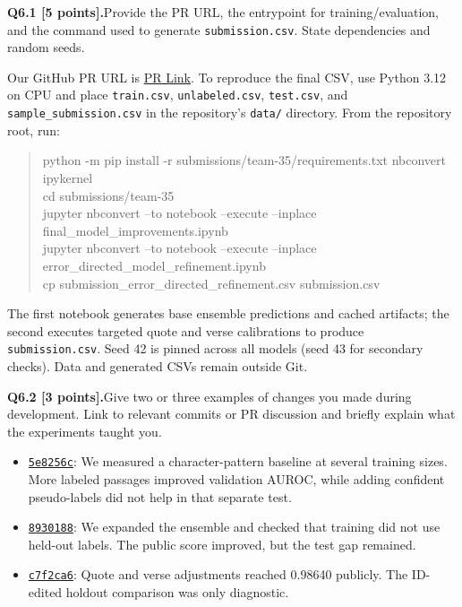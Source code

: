 \documentclass[11pt,letterpaper]{article}
\newcommand{\question}[2]{\needspace{4\baselineskip}\par\addvspace{0.45em}\noindent\textbf{#1}\quad #2\par\nobreak\vspace{0.1em}}
\begin{document}
\question{Q6.1 [5 points].}{Provide the PR URL, the entrypoint for training/evaluation, and the command used to generate \texttt{submission.csv}. State dependencies and random seeds.}
Our GitHub PR URL is \href{https://github.com/sekhari/human-or-ai-submissions/pull/6}{PR Link}. To reproduce the final CSV, use Python 3.12 on CPU and place \texttt{train.csv}, \texttt{unlabeled.csv}, \texttt{test.csv}, and \texttt{sample\_submission.csv} in the repository's \texttt{data/} directory. From the repository root, run:
\begin{quote}\vspace{-0.5em}\footnotesize\ttfamily
python -m pip install -r submissions/team-35/requirements.txt nbconvert ipykernel\\
cd submissions/team-35\\
jupyter nbconvert --to notebook --execute --inplace final\_model\_improvements.ipynb\\
jupyter nbconvert --to notebook --execute --inplace error\_directed\_model\_refinement.ipynb\\
cp submission\_error\_directed\_refinement.csv submission.csv
\vspace{-0.5em}\end{quote}
The first notebook generates base ensemble predictions and cached artifacts; the second executes targeted quote and verse calibrations to produce \texttt{submission.csv}. Seed 42 is pinned across all models (seed 43 for secondary checks). Data and generated CSVs remain outside Git.

\question{Q6.2 [3 points].}{Give two or three examples of changes you made during development. Link to relevant commits or PR discussion and briefly explain what the experiments taught you.}
\begin{itemize}[topsep=0pt,itemsep=0pt,parsep=0pt]
\item \href{https://github.com/jaminatore/human-or-ai-submissions/commit/5e8256c}{\texttt{5e8256c}}: We measured a character-pattern baseline at several training sizes. More labeled passages improved validation AUROC, while adding confident pseudo-labels did not help in that separate test.
\item \href{https://github.com/jaminatore/human-or-ai-submissions/commit/8930188}{\texttt{8930188}}: We expanded the ensemble and checked that training did not use held-out labels. The public score improved, but the test gap remained.
\item \href{https://github.com/jaminatore/human-or-ai-submissions/commit/c7f2ca6}{\texttt{c7f2ca6}}: Quote and verse adjustments reached 0.98640 publicly. The ID-edited holdout comparison was only diagnostic.
\end{itemize}
\end{document}
